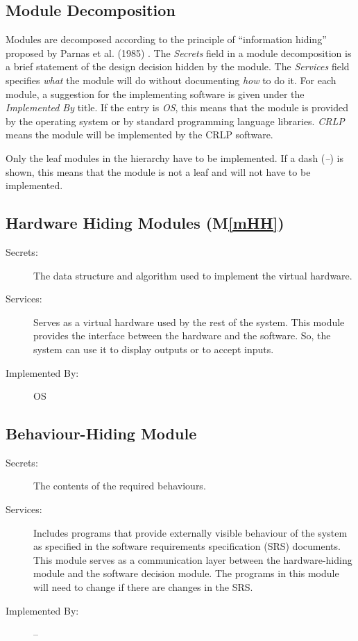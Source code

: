 \documentclass[12pt, titlepage]{article}
\newcommand{\mref}[1]{M\ref{#1}}
\begin{document}
\begin{description}
\section{Module Decomposition} \label{SecMD}

Modules are decomposed according to the principle of ``information hiding''
proposed by Parnas et al. (1985) \cite{ParnasEtAl1985}. The \emph{Secrets} field in a module decomposition is a brief statement of the design decision hidden by the module. The \emph{Services} field specifies \emph{what} the module will do without documenting \emph{how} to do it. For each module, a suggestion for the implementing software is given under the \emph{Implemented By} title. If the entry is \emph{OS}, this means that the module is provided by the operating system or by standard programming language libraries.  \emph{CRLP} means the module will be implemented by the CRLP software.

Only the leaf modules in the hierarchy have to be implemented. If a dash
(\emph{--}) is shown, this means that the module is not a leaf and will not have
to be implemented.

\subsection{Hardware Hiding Modules (\mref{mHH})}

\begin{description}
    \item[Secrets:]The data structure and algorithm used to implement the virtual hardware.
    \item[Services:]Serves as a virtual hardware used by the rest of the system. This module provides the interface between the hardware and the software. So, the system can use it to display outputs or to accept inputs.
    \item[Implemented By:] OS
\end{description}

\subsection{Behaviour-Hiding Module}

\begin{description}
    \item[Secrets:]The contents of the required behaviours.
    \item[Services:]Includes programs that provide externally visible behaviour of the system as specified in the software requirements specification (SRS) documents. This module serves as a communication layer between the hardware-hiding module and the software decision module. The programs in this module will need to change if there are changes in the SRS.
    \item[Implemented By:] --
\end{description}


\end{description}
\end{document}
